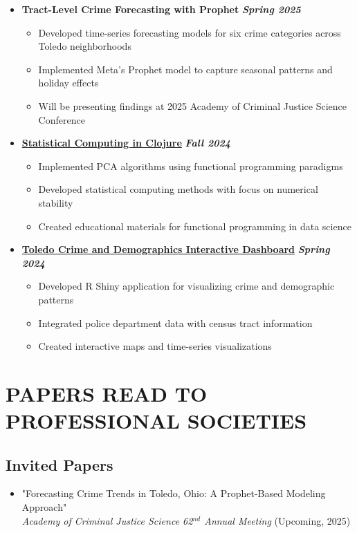 \documentclass[11pt,letterpaper]{article}
\begin{document}
\begin{itemize}
    \item \textbf{Tract-Level Crime Forecasting with Prophet} \hfill \textbf{\textit{Spring 2025}}
    \begin{itemize}
        \item Developed time-series forecasting models for six crime categories across Toledo neighborhoods
        \item Implemented Meta's Prophet model to capture seasonal patterns and holiday effects
        \item Will be presenting findings at 2025 Academy of Criminal Justice Science Conference
    \end{itemize}

    \item \textbf{\href{https://adabwana.github.io/f24-cs7300-final-project/}{Statistical Computing in Clojure}} \hfill \textbf{\textit{Fall 2024}}
    \begin{itemize}
        \item Implemented PCA algorithms using functional programming paradigms
        \item Developed statistical computing methods with focus on numerical stability
        \item Created educational materials for functional programming in data science
    \end{itemize}

    \item \textbf{\href{https://adabwana.shinyapps.io/MapApp/}{Toledo Crime and Demographics Interactive Dashboard}} \hfill \textbf{\textit{Spring 2024}}
    \begin{itemize}
        \item Developed R Shiny application for visualizing crime and demographic patterns
        \item Integrated police department data with census tract information
        \item Created interactive maps and time-series visualizations
    \end{itemize}
\end{itemize}

\section{PAPERS READ TO PROFESSIONAL SOCIETIES}

\subsection*{Invited Papers}
\begin{itemize}
    \item "Forecasting Crime Trends in Toledo, Ohio: A Prophet-Based Modeling Approach" \\
    \textit{Academy of Criminal Justice Science 62$^{nd}$ Annual Meeting} (Upcoming, 2025)
\end{itemize}
\end{document}

